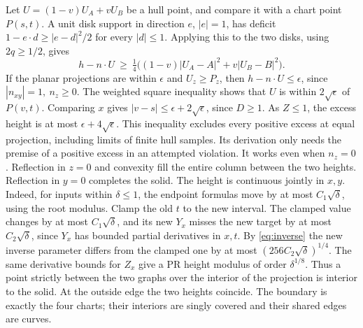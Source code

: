 \documentclass[11pt,letterpaper]{article}
\newcommand{\subt}[1]{\par\medskip\noindent{\color{sea}\bfseries #1}\enspace}
\begin{document}
\subt{No extra height at a vertical tangent.}
Let \(U=(1-v)U_A+vU_B\) be a hull point, and compare it with a chart point \(P(s,t)\). A unit disk support in direction \(e\), \(|e|=1\), has deficit \(1-e\cdot d\ge |e-d|^2/2\) for every \(|d|\le1\). Applying this to the two disks, using \(2q\ge1/2\), gives
\[
 h-n\cdot U\ \ge\ \tfrac14\big((1-v)|U_A-A|^2+v|U_B-B|^2\big).
\]
If the planar projections are within \(\epsilon\) and \(U_z\ge P_z\), then \(h-n\cdot U\le\epsilon\), since \(|n_{xy}|=1,\ n_z\ge0\). The weighted square inequality shows that \(U\) is within \(2\sqrt\epsilon\) of \(P(v,t)\). Comparing \(x\) gives \(|v-s|\le\epsilon+2\sqrt\epsilon\), since \(D\ge1\). As \(Z\le1\), the excess height is at most \(\epsilon+4\sqrt\epsilon\). This inequality excludes every positive excess at equal projection, including limits of finite hull samples. Its derivation only needs the premise of a positive excess in an attempted violation. It works even when \(n_z=0\). Reflection in \(z=0\) and convexity fill the entire column between the two heights. Reflection in \(y=0\) completes the solid. The height is continuous jointly in \(x,y\). Indeed, for inputs within \(\delta\le1\), the endpoint formulas move by at most \(C_1\sqrt\delta\), using the root modulus. Clamp the old \(t\) to the new interval. The clamped value changes by at most \(C_1\sqrt\delta\), and its new \(Y_x\) misses the new target by at most \(C_2\sqrt\delta\), since \(Y_x\) has bounded partial derivatives in \(x,t\). By \eqref{eq:inverse} the new inverse parameter differs from the clamped one by at most \((256C_2\sqrt\delta)^{1/4}\). The same derivative bounds for \(Z_x\) give a PR height modulus of order \(\delta^{1/8}\). Thus a point strictly between the two graphs over the interior of the projection is interior to the solid. At the outside edge the two heights coincide. The boundary is exactly the four charts; their interiors are singly covered and their shared edges are curves.
\end{document}
